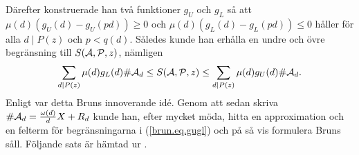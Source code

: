 Därefter konstruerade han två funktioner $g_U$ och $g_L$ så att $\mu(d)(g_U(d)-g_U(pd))\geq0$ och $\mu(d)(g_L(d)-g_L(pd))\leq0$ håller för alla $d \mid P(z)$ och $p<q(d)$.
Således kunde han erhålla en undre och övre begränsning till $\S{A}{P}{z}$, nämligen
\begin{equation}\label{brun.eq.gugl}
    \sum_{d \mid P(z)} \mu(d) g_L(d) \card\A_d 
    \leq \S{A}{P}{z} 
    \leq \sum_{d \mid P(z)} \mu(d) g_U(d) \card\A_d.
\end{equation}
Enligt \cite{cojocarumurty} var detta Bruns innoverande idé.
Genom att sedan skriva $\card\A_d=\frac{\omega(d)}{d}X + R_d$ kunde han, efter mycket möda, hitta en approximation och en felterm för begränsningarna i (\ref{brun.eq.gugl}) och på så vis formulera Bruns såll. Följande sats är hämtad ur \cite[Kap. 6.2]{cojocarumurty}.



\begin{comment}
Vi nöjer oss med att beskriva huvudidéen bakom sållet med stöd i \cite[kap 6.2]{cojocarumurty}. %

Viggo Brun bevisade att för varje funktion $g$ så att $g(1)=1$, gäller det att
\begin{equation*}
    \sum_{d \mid P(z)} \mu(d) g(d) \card\A_d = \S{A}{P}{z} + G(\A,\P,z),
\end{equation*} %
där $G$ är en funktion av $\A,\P$ och $z$, explicit definierad med hjälp av $g$.
Därefter hittade Brun ytterligare krav på funktionen $g$ så att $G\leq0$ eller $G\geq0$ alltid gäller. 
Således kunde en undre och övre begränsning till $\S{A}{P}{z}$ erhållas.
Mer specifikt, tag två funktioner $g_U$ och $g_L$ som uppfyller
\begin{align*}
    g_U=g_L=1,\\
    \mu(d)(g_U(d)-g_U(pd)) &\geq 0,\\
    \mu(d)(g_L(d)-g_L(pd)) &\leq 0,
\end{align*}
för alla kvadratfria tal $d$ och $p<q$ för alla $q\mid d$. Då gäller det att
\begin{equation}\label{brun.eq.gugl}
    \sum_{d \mid P(z)} \mu(d) g_L(d) \card\A_d 
    \leq \S{A}{P}{z} 
    \leq \sum_{d \mid P(z)} \mu(d) g_U(d) \card\A_d.
\end{equation}
Enligt \cite{cojocarumurty} var detta Bruns innovativa idé. %
Genom att sedan skriva $\card\A_d=\frac{\omega(d)}{d}X + R_d$ kunde han, efter mycket möda, hitta en approximation och en felterm för begränsningarna i (\ref{brun.eq.gugl}) och på så vis formulera Bruns såll. Följande sats är hämtad ur \cite[Kap. 6.2]{cojocarumurty}.
\end{comment}


